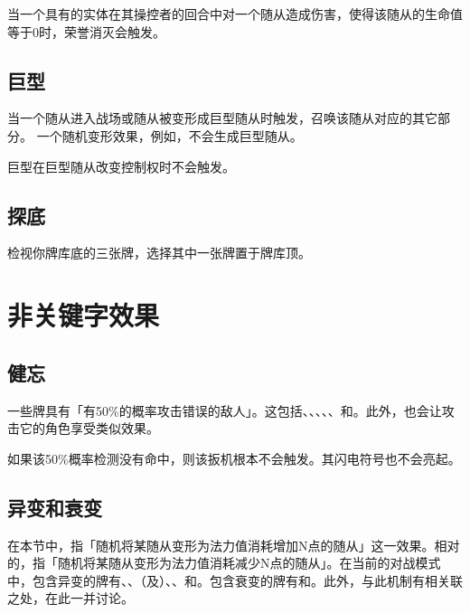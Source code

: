 当一个具有的实体在其操控者的回合中对一个随从造成伤害，使得该随从的生命值等于0时，荣誉消灭会触发。

\subsection{巨型}
\label{colossal}

当一个随从进入战场或随从被变形成巨型随从时触发，召唤该随从对应的其它部分。
\notice 一个随机变形效果，例如，不会生成巨型随从。

巨型在巨型随从改变控制权时不会触发。

\subsection{探底}
\label{dredge}

检视你牌库底的三张牌，选择其中一张牌置于牌库顶。

\section{非关键字效果}

\subsection{健忘}
\label{forgetful}

一些牌具有「有50\%的概率攻击错误的敌人」。这包括、、、、、和。此外，也会让攻击它的角色享受类似效果。

如果该50\%概率检测没有命中，则该扳机根本不会触发。其闪电符号也不会亮起。

\subsection{异变和衰变}
\label{evolve-and-devolve}

在本节中，指「随机将某随从变形为法力值消耗增加N点的随从」这一效果。相对的，指「随机将某随从变形为法力值消耗减少N点的随从」。在当前的对战模式中，包含异变的牌有、、（及）、、和。包含衰变的牌有和。此外，与此机制有相关联之处，在此一并讨论。

